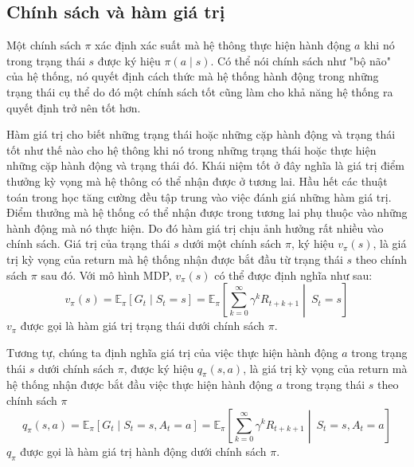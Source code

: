 	
	\subsection{Chính sách và hàm giá trị}
	Một chính sách $\pi$ xác định xác suất mà hệ thông thực hiện hành động $a$ khi nó trong trạng thái $s$ được ký hiệu $\pi(a \mid s)$. Có thể nói chính sách như "bộ não" của hệ thống, nó quyết định cách thức mà hệ thống hành động trong những trạng thái cụ thể do đó một chính sách tốt cũng làm cho khả năng hệ thống ra quyết định trở nên tốt hơn.
		
	Hàm giá trị cho biết những trạng thái hoặc những cặp hành động và trạng thái tốt như thế nào cho hệ thông khi nó trong những trạng thái hoặc thực hiện những cặp hành động và trạng thái đó. Khái niệm tốt ở đây nghĩa là giá trị điểm thưởng kỳ vọng mà hệ thông có thể nhận được ở tương lai. Hầu hết các thuật toán trong học tăng cường đều tập trung vào việc đánh giá những hàm giá trị. Điểm thưởng mà hệ thống có thể nhận được trong tương lai phụ thuộc vào những hành động mà nó thực hiện. Do đó hàm giá trị chịu ảnh hưởng rất nhiều vào chính sách. Giá trị của trạng thái $s$ dưới một chính sách $\pi$, ký hiệu $v_{\pi}(s)$, là giá trị kỳ vọng của return mà hệ thống nhận được bắt đầu từ trạng thái $s$ theo chính sách $\pi$ sau đó. Với mô hình MDP, $v_{\pi}(s)$ có thể được định nghĩa như sau:
	\begin{equation}
	v_{\pi}(s) = \mathbb{E}_{\pi}\left [\mathit{G}_t \mid \mathit{S}_{t} = s\right ] = \mathbb{E}_{\pi}\left [\sum_{k = 0}^{\infty}\gamma^{k}\mathit{R}_{t+k+1} \middle|\ \mathit{S}_t= s\right ]
	\end{equation}
	$v_{\pi}$ được gọi là hàm giá trị trạng thái dưới chính sách $\pi$.
	
	Tương tự, chúng ta định nghĩa giá trị của việc thực hiện hành động $a$ trong trạng thái $s$ dưới chính sách $\pi$, được ký hiệu $q_{\pi}(s,a)$, là giá trị kỳ vọng của return mà hệ thống nhận được bắt đầu việc thực hiện hành động $a$ trong trạng thái $s$ theo chính sách $\pi$
	\begin{equation}
	q_{\pi}(s,a) = \mathbb{E}_{\pi}\left [\mathit{G}_t \mid \mathit{S}_{t} = s, \mathit{A}_{t} = a  \right ] = \mathbb{E}_{\pi}\left [\sum_{k = 0}^{\infty}\gamma^{k}\mathit{R}_{t+k+1} \middle|\ \mathit{S}_t= s, \mathit{A}_{t} = a \right ]
	\end{equation}
	$q_{\pi}$ được gọi là hàm giá trị hành động dưới chính sách $\pi$.
	

